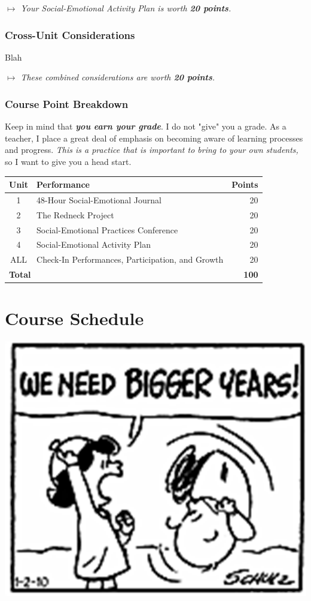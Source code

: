 \documentclass{tufte-handout}
\begin{document}
\medskip\noindent\textit{$\mapsto$ Your Social-Emotional Activity Plan is worth \textbf{20 points}.}

\section{Cross-Unit Considerations}

Blah

\medskip\noindent\textit{$\mapsto$ These combined considerations are worth \textbf{20 points}.}

\section{Course Point Breakdown}

Keep in mind that \emph{\textbf{you earn your grade}}. I do not "give" you a grade. As a teacher, I place a great deal of emphasis on becoming aware of learning processes and progress. \emph{This is a practice that is important to bring to your own students,} so I want to give you a head start.

\bigskip

\begin{tabular}{clr}
	\toprule
	Unit & Performance & Points \\
	\midrule\midrule
	1 & 48-Hour Social-Emotional Journal & 20 \\
	\midrule
	2 & The Redneck Project & 20 \\
	\midrule
	3 & Social-Emotional Practices Conference & 20 \\
	\midrule
	4 & Social-Emotional Activity Plan & 20 \\
	\midrule
	ALL & Check-In Performances, Participation, and Growth & 20 \\
	\midrule\midrule
	\multicolumn{2}{l}{\textbf{Total}} & \textbf{100} \\
	\bottomrule
\end{tabular}

\newpage

\part{\faCalendar\medspace Course Schedule \medspace\faCalendar}

\begin{marginfigure}
	\begin{center}
		\includegraphics[width=0.4\linewidth]{sc-pic.png}
	\end{center}
\end{marginfigure}
\end{document}
